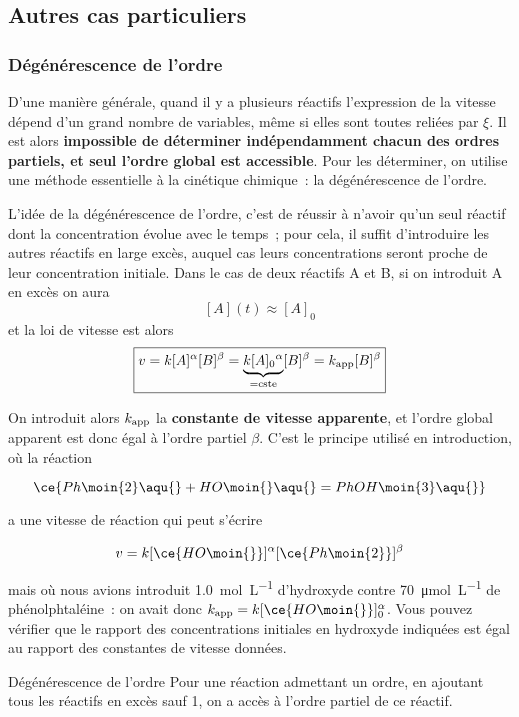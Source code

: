 \documentclass[../main/main.tex]{subfiles}
\begin{document}
\subsection{Autres cas particuliers}
\subsubsection{Dégénérescence de l'ordre}
D'une manière générale, quand il y a plusieurs réactifs l'expression de la
vitesse dépend d'un grand nombre de variables, même si elles sont toutes reliées
par $\xi$. Il est alors \textbf{impossible de déterminer indépendamment chacun
des ordres partiels, et seul l'ordre global est accessible}. Pour les
déterminer, on utilise une méthode essentielle à la cinétique chimique~: la
dégénérescence de l'ordre.\bigbreak

L'idée de la dégénérescence de l'ordre, c'est de réussir à n'avoir qu'un seul
réactif dont la concentration évolue avec le temps~; pour cela, il suffit
d'introduire les autres réactifs en large excès, auquel cas leurs concentrations
seront proche de leur concentration initiale. Dans le cas de deux réactifs A et
B, si on introduit A en excès on aura
\[[A](t) \approx [A]_0\]
et la loi de vitesse est alors
\[\boxed{v = k[A]^{\alpha}[B]^{\beta}
    = \underbrace{k[A]_0{}^{\alpha}}_{= \rm cste}[B]^{\beta}
= k_{\rm app}[B]^{\beta}}
\]

On introduit alors $k_{\rm app}$ la \textbf{constante de vitesse apparente}, et
l'ordre global apparent est donc égal à l'ordre partiel $\beta$. C'est le
principe utilisé en introduction, où la réaction

\[\ce{Ph\moin{2}\aqu{} + HO\moin{}\aqu{} = PhOH\moin{3}\aqu{}}\]

a une vitesse de réaction qui peut s'écrire

\[v = k[\ce{HO\moin{}}]^{\alpha}[\ce{Ph\moin{2}}]^{\beta}\]

mais où nous avions introduit \SI{1.0}{mol.L^{-1}} d'hydroxyde contre
\SI{70}{\micro mol.L^{-1}} de phénolphtaléine~: on avait donc $k_{\rm app} =
k[\ce{HO\moin{}}]_0^{\alpha}$. Vous pouvez vérifier que le rapport des
concentrations initiales en hydroxyde indiquées est égal au rapport des
constantes de vitesse données.

\begin{prop}[label=prop:dege, heart, halign=center]{Dégénérescence de l'ordre}
    \textcolor{\switch{black!100}{red!10}}{
        Pour une réaction admettant un ordre, en ajoutant tous les réactifs en excès
    sauf 1, on a accès à l'ordre partiel de ce réactif.}
\end{prop}
\end{document}
